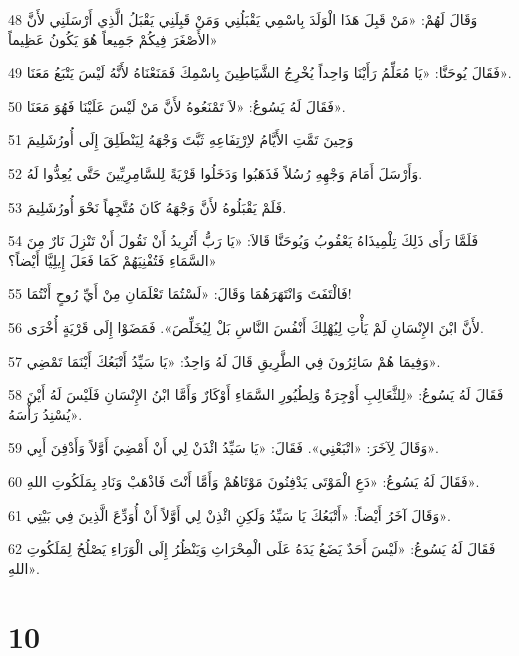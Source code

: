 \par 48 وَقَالَ لَهُمْ: «مَنْ قَبِلَ هَذَا الْوَلَدَ بِاسْمِي يَقْبَلُنِي وَمَنْ قَبِلَنِي يَقْبَلُ الَّذِي أَرْسَلَنِي لأَنَّ الأَصْغَرَ فِيكُمْ جَمِيعاً هُوَ يَكُونُ عَظِيماً»
\par 49 فَقَالَ يُوحَنَّا: «يَا مُعَلِّمُ رَأَيْنَا وَاحِداً يُخْرِجُ الشَّيَاطِينَ بِاسْمِكَ فَمَنَعْنَاهُ لأَنَّهُ لَيْسَ يَتْبَعُ مَعَنَا».
\par 50 فَقَالَ لَهُ يَسُوعُ: «لاَ تَمْنَعُوهُ لأَنَّ مَنْ لَيْسَ عَلَيْنَا فَهُوَ مَعَنَا».
\par 51 وَحِينَ تَمَّتِ الأَيَّامُ لاِرْتِفَاعِهِ ثَبَّتَ وَجْهَهُ لِيَنْطَلِقَ إِلَى أُورُشَلِيمَ
\par 52 وَأَرْسَلَ أَمَامَ وَجْهِهِ رُسُلاً فَذَهَبُوا وَدَخَلُوا قَرْيَةً لِلسَّامِرِيِّينَ حَتَّى يُعِدُّوا لَهُ.
\par 53 فَلَمْ يَقْبَلُوهُ لأَنَّ وَجْهَهُ كَانَ مُتَّجِهاً نَحْوَ أُورُشَلِيمَ.
\par 54 فَلَمَّا رَأَى ذَلِكَ تِلْمِيذَاهُ يَعْقُوبُ وَيُوحَنَّا قَالاَ: «يَا رَبُّ أَتُرِيدُ أَنْ نَقُولَ أَنْ تَنْزِلَ نَارٌ مِنَ السَّمَاءِ فَتُفْنِيَهُمْ كَمَا فَعَلَ إِيلِيَّا أَيْضاً؟»
\par 55 فَالْتَفَتَ وَانْتَهَرَهُمَا وَقَالَ: «لَسْتُمَا تَعْلَمَانِ مِنْ أَيِّ رُوحٍ أَنْتُمَا!
\par 56 لأَنَّ ابْنَ الإِنْسَانِ لَمْ يَأْتِ لِيُهْلِكَ أَنْفُسَ النَّاسِ بَلْ لِيُخَلِّصَ». فَمَضَوْا إِلَى قَرْيَةٍ أُخْرَى.
\par 57 وَفِيمَا هُمْ سَائِرُونَ فِي الطَّرِيقِ قَالَ لَهُ وَاحِدٌ: «يَا سَيِّدُ أَتْبَعُكَ أَيْنَمَا تَمْضِي».
\par 58 فَقَالَ لَهُ يَسُوعُ: «لِلثَّعَالِبِ أَوْجِرَةٌ وَلِطُيُورِ السَّمَاءِ أَوْكَارٌ وَأَمَّا ابْنُ الإِنْسَانِ فَلَيْسَ لَهُ أَيْنَ يُسْنِدُ رَأْسَهُ».
\par 59 وَقَالَ لِآخَرَ: «اتْبَعْنِي». فَقَالَ: «يَا سَيِّدُ ائْذَنْ لِي أَنْ أَمْضِيَ أَوَّلاً وَأَدْفِنَ أَبِي».
\par 60 فَقَالَ لَهُ يَسُوعُ: «دَعِ الْمَوْتَى يَدْفِنُونَ مَوْتَاهُمْ وَأَمَّا أَنْتَ فَاذْهَبْ وَنَادِ بِمَلَكُوتِ اللهِ».
\par 61 وَقَالَ آخَرُ أَيْضاً: «أَتْبَعُكَ يَا سَيِّدُ وَلَكِنِ ائْذِنْ لِي أَوَّلاً أَنْ أُوَدِّعَ الَّذِينَ فِي بَيْتِي».
\par 62 فَقَالَ لَهُ يَسُوعُ: «لَيْسَ أَحَدٌ يَضَعُ يَدَهُ عَلَى الْمِحْرَاثِ وَيَنْظُرُ إِلَى الْوَرَاءِ يَصْلُحُ لِمَلَكُوتِ اللهِ».

\chapter{10}

